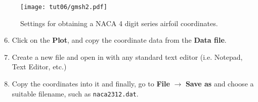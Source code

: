 \begin{figure}[H]
    \centering
    \texttt{[image: tut06/gmsh2.pdf]}
    \caption{Settings for obtaining a NACA 4 digit series airfoil coordinates.}
    \label{fig6:gmsh2}
\end{figure}
\begin{enumerate}[label=\arabic*)]
	\setcounter{enumi}{5}
	\item Click on the \textbf{Plot}, and copy the coordinate data from the \textbf{Data file}.
	\item Create a new file and open in with any standard text editor (i.e. Notepad, Text Editor, etc.)
	\item Copy the coordinates into it and finally, go to \textbf{File} $\rightarrow$ \textbf{Save as} and choose a suitable filename, such as \texttt{naca2312.dat}.
\end{enumerate}
